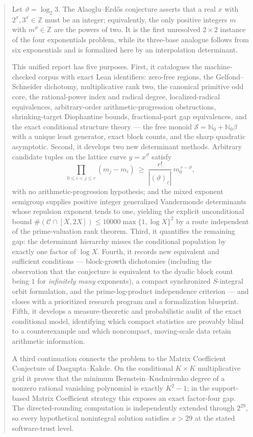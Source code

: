 \documentclass[11pt,oneside]{article}
\theoremstyle{definition}
\theoremstyle{remark}
\newcommand{\Nzero}{\mathbb N_0}
\newcommand{\Z}{\mathbb Z}
\newcommand{\thetaq}{\vartheta}
\newcommand{\Sol}{\mathcal S}
\newcommand{\Cand}{\mathcal C}
\newcommand{\fall}[2]{\left(#1\right)_{\!\underline{#2}}}
\begin{document}
\begin{abstract}
Let $\thetaq=\log_2 3$.  The Alaoglu--Erd\H{o}s conjecture asserts that a real $x$ with
$2^x,3^x\in\Z$ must be an integer; equivalently, the only positive integers $m$ with
$m^{\thetaq}\in\Z$ are the powers of two.  It is the first unresolved $2\times2$ instance of
the four exponentials problem, while its three-base analogue follows from six exponentials and
is formalized here by an interpolation determinant.

This unified report has five purposes.  First, it catalogues the machine-checked corpus with
exact Lean identifiers: zero-free regions, the Gelfond--Schneider dichotomy, multiplicative
rank two, the canonical primitive odd core, the rational-power index and radical degree,
localized-radical equivalences, arbitrary-order arithmetic-progression obstructions,
shrinking-target Diophantine bounds, fractional-part gap equivalences, and the exact
conditional structure theory --- the free monoid $\Sol=\Nzero+\Nzero\beta$ with a unique least
generator, exact block counts, and the sharp quadratic asymptotic.  Second, it develops two new
determinant methods.  Arbitrary candidate tuples on the lattice curve $y=x^{\thetaq}$ satisfy
\[
 \prod_{0\le i<j\le r}(m_j-m_i)\ \ge\ \frac{r!}{|\fall{\thetaq}{r}|}\,m_0^{\,r-\thetaq},
\]
with no arithmetic-progression hypothesis; and the mixed exponent semigroup supplies positive
integer generalized Vandermonde determinants whose repulsion exponent tends to one, yielding
the explicit unconditional bound $\#(\Cand\cap[X,2X])\le10000\max\{1,\log X\}^2$ by a route
independent of the prime-valuation rank theorem.  Third, it quantifies the remaining gap: the
determinant hierarchy misses the conditional population by exactly one factor of $\log X$.
Fourth, it records new equivalent and sufficient conditions --- block-growth dichotomies
(including the observation that the conjecture is equivalent to the dyadic block count being
$1$ for \emph{infinitely many} exponents), a compact synchronized $S$-integral orbit
formulation, and the prime-log-product independence criterion --- and closes with a
prioritized research program and a formalization blueprint.  Fifth, it develops a
measure-theoretic and probabilistic audit of the exact conditional model, identifying
which compact statistics are provably blind to a counterexample and which noncompact,
moving-scale data retain arithmetic information.


A third continuation connects the problem to the Matrix Coefficient Conjecture of
Dasgupta--Kakde.  On the conditional $K\times K$ multiplicative grid it proves that the
minimum Bernstein--Kushnirenko degree of a nonzero rational vanishing polynomial is exactly
$K^2-1$; in the support-based Matrix Coefficient strategy this exposes an exact factor-four
gap.  The directed-rounding computation is independently extended through $2^{29}$, so every
hypothetical nonintegral solution satisfies $x>29$ at the stated software-trust level.


\end{abstract}
\end{document}
